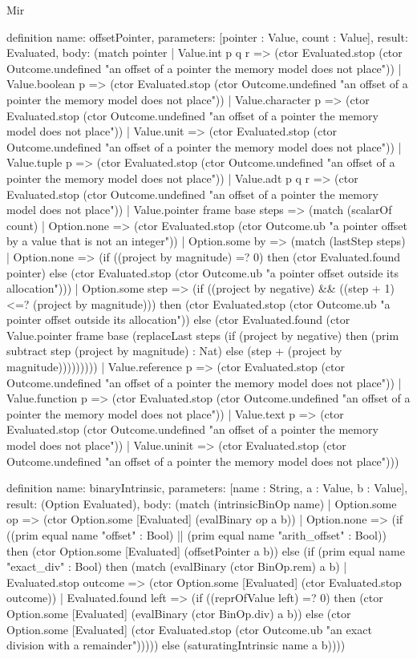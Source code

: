 \begin{lexlean}{Mir}
\begin{semanticmodule}
definition{
  name: offsetPointer,
  parameters: [pointer : Value, count : Value],
  result: Evaluated,
  body: (match pointer
    | Value.int p q r => (ctor Evaluated.stop (ctor Outcome.undefined "an offset of a pointer the memory model does not place"))
    | Value.boolean p => (ctor Evaluated.stop (ctor Outcome.undefined "an offset of a pointer the memory model does not place"))
    | Value.character p => (ctor Evaluated.stop (ctor Outcome.undefined "an offset of a pointer the memory model does not place"))
    | Value.unit => (ctor Evaluated.stop (ctor Outcome.undefined "an offset of a pointer the memory model does not place"))
    | Value.tuple p => (ctor Evaluated.stop (ctor Outcome.undefined "an offset of a pointer the memory model does not place"))
    | Value.adt p q r => (ctor Evaluated.stop (ctor Outcome.undefined "an offset of a pointer the memory model does not place"))
    | Value.pointer frame base steps => (match (scalarOf count) | Option.none => (ctor Evaluated.stop (ctor Outcome.ub "a pointer offset by a value that is not an integer")) | Option.some by => (match (lastStep steps) | Option.none => (if ((project by magnitude) =? 0) then (ctor Evaluated.found pointer) else (ctor Evaluated.stop (ctor Outcome.ub "a pointer offset outside its allocation"))) | Option.some step => (if ((project by negative) && ((step + 1) <=? (project by magnitude))) then (ctor Evaluated.stop (ctor Outcome.ub "a pointer offset outside its allocation")) else (ctor Evaluated.found (ctor Value.pointer frame base (replaceLast steps (if (project by negative) then (prim subtract step (project by magnitude) : Nat) else (step + (project by magnitude)))))))))
    | Value.reference p => (ctor Evaluated.stop (ctor Outcome.undefined "an offset of a pointer the memory model does not place"))
    | Value.function p => (ctor Evaluated.stop (ctor Outcome.undefined "an offset of a pointer the memory model does not place"))
    | Value.text p => (ctor Evaluated.stop (ctor Outcome.undefined "an offset of a pointer the memory model does not place"))
    | Value.uninit => (ctor Evaluated.stop (ctor Outcome.undefined "an offset of a pointer the memory model does not place")))
}

definition{
  name: binaryIntrinsic,
  parameters: [name : String, a : Value, b : Value],
  result: (Option Evaluated),
  body: (match (intrinsicBinOp name)
    | Option.some op => (ctor Option.some [Evaluated] (evalBinary op a b))
    | Option.none => (if ((prim equal name "offset" : Bool) || (prim equal name "arith_offset" : Bool)) then (ctor Option.some [Evaluated] (offsetPointer a b)) else (if (prim equal name "exact_div" : Bool) then (match (evalBinary (ctor BinOp.rem) a b)
      | Evaluated.stop outcome => (ctor Option.some [Evaluated] (ctor Evaluated.stop outcome))
      | Evaluated.found left => (if ((reprOfValue left) =? 0) then (ctor Option.some [Evaluated] (evalBinary (ctor BinOp.div) a b)) else (ctor Option.some [Evaluated] (ctor Evaluated.stop (ctor Outcome.ub "an exact division with a remainder"))))) else (saturatingIntrinsic name a b))))
}


\end{semanticmodule}
\end{lexlean}
